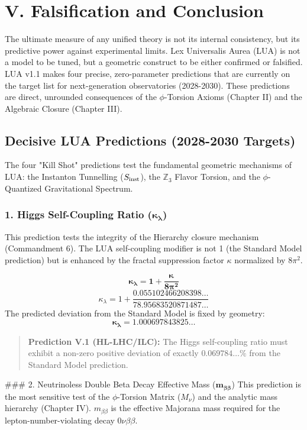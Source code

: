 \section{V. Falsification and Conclusion}
\label{sec:falsification}

The ultimate measure of any unified theory is not its internal consistency, but its predictive power against experimental limits. Lex Universalis Aurea (LUA) is not a model to be tuned, but a geometric construct to be either confirmed or falsified. LUA v1.1 makes four precise, zero-parameter predictions that are currently on the target list for next-generation observatories (2028-2030). These predictions are direct, unrounded consequences of the $\phi$-Torsion Axioms (Chapter II) and the Algebraic Closure (Chapter III).

\subsection{Decisive LUA Predictions (2028-2030 Targets)}
\label{sec:predictions}

The four "Kill Shot" predictions test the fundamental geometric mechanisms of LUA: the Instanton Tunnelling ($S_{\rm inst}$), the $\mathbb{Z}_3$ Flavor Torsion, and the $\phi$-Quantized Gravitational Spectrum.

\subsubsection*{1. Higgs Self-Coupling Ratio ($\mathbf{\kappa_\lambda}$)}
This prediction tests the integrity of the Hierarchy closure mechanism (Commandment 6). The LUA self-coupling modifier is not 1 (the Standard Model prediction) but is enhanced by the fractal suppression factor $\kappa$ normalized by $8\pi^2$.

$$
\mathbf{\kappa_\lambda = 1 + \frac{\kappa}{8\pi^2}}
$$
$$
\kappa_\lambda = 1 + \frac{0.055102466208398\dots}{78.95683520871487\dots}
$$
The predicted deviation from the Standard Model is fixed by geometry:
$$
\mathbf{\kappa_\lambda = 1.000697843825\dots}
$$
\begin{quote}
\textbf{Prediction V.1 (HL-LHC/ILC):} The Higgs self-coupling ratio must exhibit a non-zero positive deviation of exactly $\mathbf{0.069784\dots \%}$ from the Standard Model prediction.
\end{quote}

### 2. Neutrinoless Double Beta Decay Effective Mass ($\mathbf{m_{\beta\beta}}$)
This prediction is the most sensitive test of the $\phi$-Torsion Matrix ($M_\nu$) and the analytic mass hierarchy (Chapter IV). $m_{\beta\beta}$ is the effective Majorana mass required for the lepton-number-violating decay $0\nu\beta\beta$.


